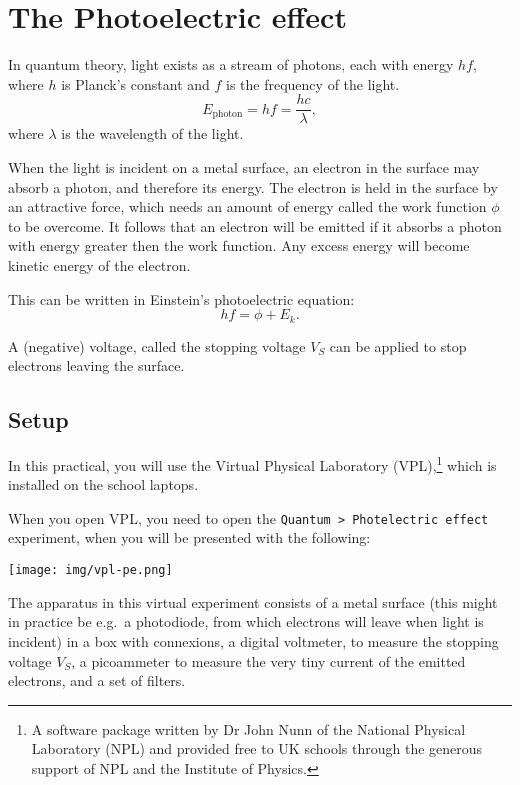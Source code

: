 \section{The Photoelectric effect}
\label{photoelectric}

In quantum theory, light exists as a stream of photons, each with energy $hf$, where $h$ is Planck's constant and $f$ is the frequency of the light.
\[E_{\text{photon}}=hf=\frac{hc}{\lambda},\]
where $\lambda$ is the wavelength of the light.

When the light is incident on a metal surface, an electron in the surface may absorb a photon, and therefore its energy.  The electron is held in the surface by an attractive force, which needs an amount of energy called the work function $\phi$ to be overcome.  It follows that an electron will be emitted if it absorbs a photon with energy greater then the work function.  Any excess energy will become kinetic energy of the electron.

This can be written in Einstein's photoelectric equation:
\[hf=\phi+E_{k}.\]

A (negative) voltage, called the stopping voltage $V_{S}$ can be applied to stop electrons leaving the surface.

\subsection{Setup}

In this practical, you will use the Virtual Physical Laboratory (VPL),\footnote{A software package written by Dr John Nunn of the National Physical Laboratory (NPL) and provided free to UK schools through the generous support of NPL and the Institute of Physics.} which is installed on the school laptops.  

When you open VPL, %
you need to open the \texttt{Quantum > Photelectric effect} experiment, when you will be presented with the following:

\hfill \texttt{[image: img/vpl-pe.png]} \hfill{}

The apparatus in this virtual experiment consists of a metal surface (this might in practice be e.g.\ a photodiode, from which electrons will leave when light is incident) in a box with connexions, a digital voltmeter, to measure the stopping voltage $V_{S}$, a picoammeter to measure the very tiny current of the emitted electrons, and a set of filters.

